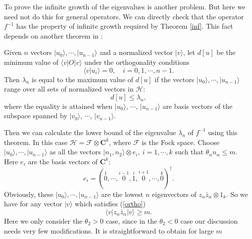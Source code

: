 \documentclass[a4paper,a4paper]{article}
\begin{document}
To prove the infinite growth of the eigenvalues is another
problem. But here we need not do this for general operators. We
can directly check that the operator $f^{-1}$ has the property of
infinite growth required by Theorem \ref{inf}. This fact depends
on another theorem in \cite{Hilbert}:
\begin{theorem}
Given $n$ vectors $|u_0\rangle,\cdots,|u_{n-1}\rangle$ and a
normalized vector $|v\rangle$, let $d[u]$ be the minimum value of
$\langle v|O|v\rangle$ under the orthogonality conditions
\begin{equation}\label{ortho}
\langle v|u_i\rangle=0,\quad i=0,1,\cdots,n-1.
\end{equation}
Then $\lambda_n$ is equal to the maximum value of $d[u]$ if the
vectors $|u_0\rangle,\cdots,|u_{n-1}\rangle$ range over all sets
of normalized vectors in $\mathcal{H}$:
\begin{equation}
d[u]\leq\lambda_n,
\end{equation}
where the equality is attained when $|u_0\rangle$, $\cdots$,
$|u_{n-1}\rangle$ are basis vectors of the subspace spanned by
$|v_0\rangle$, $\cdots$, $|v_{n-1}\rangle$.
\end{theorem}
Then we can calculate the lower bound of the eigenvalue
$\lambda_n$ of $f^{-1}$ using this theorem. In this case
$\mathcal{H}=\mathcal{F}\otimes\mathbf{C}^k$, where $\mathcal{F}$
is the Fock space. Choose $|u_0\rangle,\cdots,|u_{n-1}\rangle$ as
all the vectors $|n_1,n_2\rangle\otimes e_i,\ i=1,\cdots,k$ such
that $\theta_\alpha n_\alpha\leq m$. Here $e_i$ are the basis
vectors of $\mathbf{C}^k$:
\begin{equation}
e_i=(\stackrel{1}{0},\cdots,\stackrel{i-1}{0},
\stackrel{i}{1},\stackrel{i+1}{0},\cdots,\stackrel{k}{0})^\dag.
\end{equation}
Obviously, these $|u_0\rangle,\cdots,|u_{n-1}\rangle$ are the
lowest $n$ eigenvectors of $z_\alpha\bar{z}_\alpha\otimes 1_k$. So
we have for any vector $|v\rangle$ which satisfies (\ref{ortho})
\begin{equation}
\langle v|z_\alpha\bar{z}_\alpha|v\rangle\geq m.
\end{equation}
Here we only consider the $\theta_2>0$ case, since in the
$\theta_2<0$ case our discussion needs very few modifications. It
is straightforward to obtain for large $m$
\end{document}
